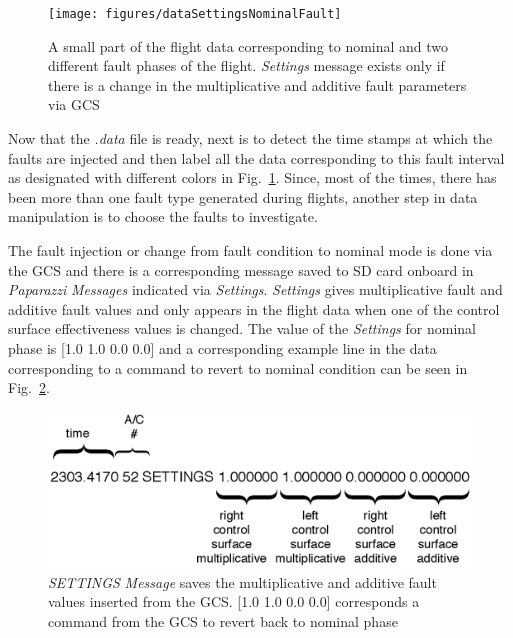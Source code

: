 \begin{figure}
\begin{center}
\texttt{[image: figures/dataSettingsNominalFault]}    %
\caption{A small part of the flight data corresponding to nominal and two different fault phases of the flight. \emph{Settings} message exists only if there is a change in the multiplicative and additive fault parameters via GCS} 
\label{fig:dataSettingsNominalFault}
\end{center}
\end{figure}


Now that the \emph{.data} file is ready, next is to detect the time stamps at which the faults are injected and then label all the data corresponding to this fault interval as designated with different colors in Fig.~\ref{fig:dataSettingsNominalFault}. 
Since, most of the times, there has been more than one fault type generated during flights, another step in data manipulation is to choose the faults to investigate. 

The fault injection or change from fault condition to nominal mode is done via the GCS and there is a corresponding message saved to SD card onboard in \emph{Paparazzi} \emph{Messages} indicated via \emph{Settings}. 
\emph{Settings} gives multiplicative fault and additive fault values and only appears in the flight data when one of the control surface effectiveness values is changed. 
The value of the \emph{Settings} for nominal phase is [1.0 1.0 0.0 0.0] and a corresponding example line in the data corresponding to a command to revert to nominal condition can be seen in Fig.~\ref{fig:flightDataSettings}. 

\begin{figure}[h]
\begin{center}
\includegraphics[width=13cm]{figures/flightDataSettings}    %
\caption{\emph{SETTINGS} \emph{Message} saves the multiplicative and additive fault values inserted from the GCS.  [1.0 1.0 0.0 0.0] corresponds a command from the GCS to revert back to nominal phase} 
\label{fig:flightDataSettings}
\end{center}
\end{figure}

